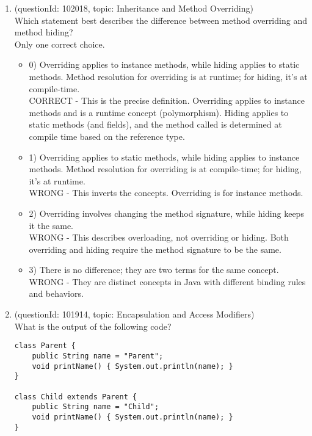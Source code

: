 \documentclass[12pt]{article}
\begin{document}
\begin{enumerate}[label=(\arabic*)]
\begin{itemize}
\end{itemize}
\item (questionId: 102018, topic: Inheritance and Method Overriding) \\ 
Which statement best describes the difference between method overriding and method hiding?
\\ \noindent Only one correct choice. 
\begin{itemize}
\item 0) Overriding applies to instance methods, while hiding applies to static methods. Method resolution for overriding is at runtime; for hiding, it's at compile-time.
 \\ 
CORRECT - This is the precise definition. Overriding applies to instance methods and is a runtime concept (polymorphism). Hiding applies to static methods (and fields), and the method called is determined at compile time based on the reference type.

\item 1) Overriding applies to static methods, while hiding applies to instance methods. Method resolution for overriding is at compile-time; for hiding, it's at runtime.
 \\ 
WRONG - This inverts the concepts. Overriding is for instance methods.

\item 2) Overriding involves changing the method signature, while hiding keeps it the same.
 \\ 
WRONG - This describes overloading, not overriding or hiding. Both overriding and hiding require the method signature to be the same.

\item 3) There is no difference; they are two terms for the same concept.
 \\ 
WRONG - They are distinct concepts in Java with different binding rules and behaviors.

\end{itemize}
\item (questionId: 101914, topic: Encapsulation and Access Modifiers) \\ 
What is the output of the following code?
\begin{verbatim}
class Parent {
    public String name = "Parent";
    void printName() { System.out.println(name); }
}

class Child extends Parent {
    public String name = "Child";
    void printName() { System.out.println(name); }
}


\end{verbatim}
\end{enumerate}
\end{document}
